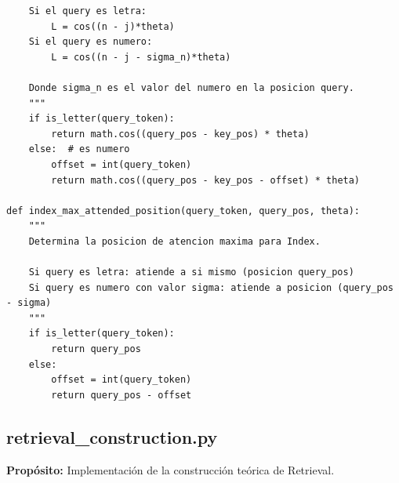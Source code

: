 \documentclass[12pt,a4paper]{report}
\begin{document}
\begin{lstlisting}
    Si el query es letra:
        L = cos((n - j)*theta)
    Si el query es numero:
        L = cos((n - j - sigma_n)*theta)
    
    Donde sigma_n es el valor del numero en la posicion query.
    """
    if is_letter(query_token):
        return math.cos((query_pos - key_pos) * theta)
    else:  # es numero
        offset = int(query_token)
        return math.cos((query_pos - key_pos - offset) * theta)

def index_max_attended_position(query_token, query_pos, theta):
    """
    Determina la posicion de atencion maxima para Index.
    
    Si query es letra: atiende a si mismo (posicion query_pos)
    Si query es numero con valor sigma: atiende a posicion (query_pos - sigma)
    """
    if is_letter(query_token):
        return query_pos
    else:
        offset = int(query_token)
        return query_pos - offset
\end{lstlisting}

\subsection{retrieval\_construction.py}
\label{subsec:retrieval_construction}

\textbf{Propósito:} Implementación de la construcción teórica de Retrieval.
\end{document}
